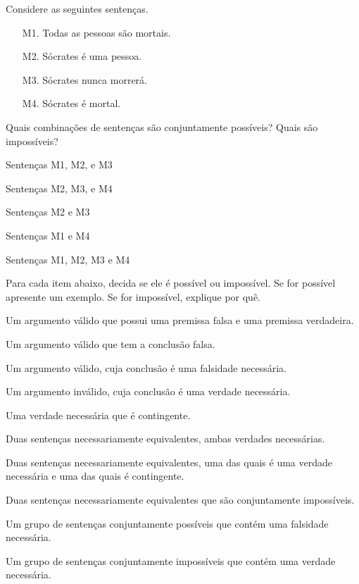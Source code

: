 \problempart Considere as seguintes sentenças.
\begin{enumerate}%
\item[M1.] \label{itm:allmortal} Todas as pessoas são mortais.
\item[M2.] \label{itm:socperson} Sócrates é uma pessoa.
\item[M3.] \label{itm:socnotdie} Sócrates nunca morrerá.
\item[M4.] \label{itm:socmortal} Sócrates é mortal.
\end{enumerate}
Quais combinações de sentenças são conjuntamente possíveis? Quais são impossíveis?
\begin{earg}
\item Sentenças M1, M2, e M3
\item Sentenças M2, M3, e M4
\item Sentenças M2 e M3
\item Sentenças M1 e M4
\item Sentenças M1, M2, M3 e M4
\end{earg}

\problempart
\label{pr.EnglishCombinations2}
Para cada item abaixo, decida se ele é possível ou impossível.
Se for possível apresente um exemplo.
Se for impossível, explique por quê.
\begin{earg}
\item Um argumento válido que possui uma premissa falsa e uma premissa verdadeira.

\item Um argumento válido que tem a conclusão falsa.

\item Um argumento válido, cuja conclusão é uma falsidade necessária.

\item Um argumento inválido, cuja conclusão é uma verdade necessária.

\item Uma verdade necessária que é contingente.

\item Duas sentenças necessariamente equivalentes, ambas verdades necessárias.

\item Duas sentenças necessariamente equivalentes, uma das quais é uma verdade necessária e uma das quais é contingente.

\item Duas sentenças necessariamente equivalentes que são conjuntamente impossíveis.

\item Um grupo de sentenças conjuntamente possíveis que contém uma falsidade necessária.

\item Um grupo de sentenças conjuntamente impossíveis que contém uma verdade necessária.
\end{earg}


